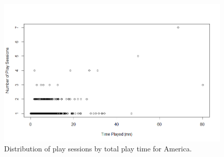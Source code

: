 \documentclass[preprint,authoryear,12pt]{elsarticle}
\begin{document}
\begin{figure}[htb]
	\begin{center}
		\includegraphics[width=.8\linewidth]{ijhcs14-img/playsessions_america}
		\caption{Distribution of play sessions by total play time for America.\label{fig:playtime_a}}
	\end{center}
\end{figure}
\end{document}
